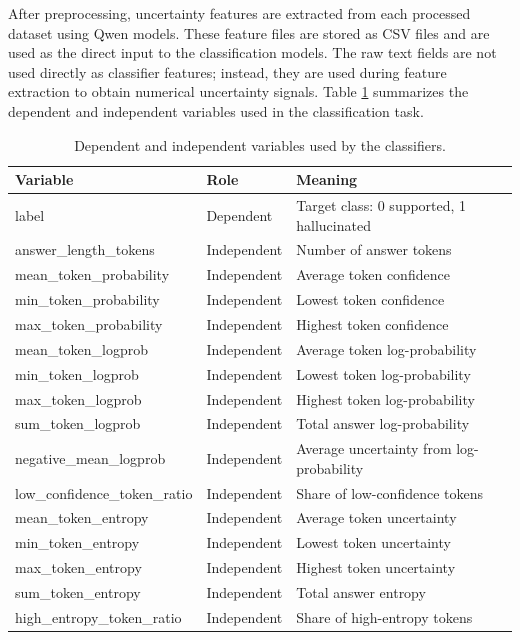 \documentclass[11pt]{article}
\begin{document}
After preprocessing, uncertainty features are extracted from each processed dataset using Qwen models. These feature files are stored as CSV files and are used as the direct input to the classification models. The raw text fields are not used directly as classifier features; instead, they are used during feature extraction to obtain numerical uncertainty signals. Table \ref{tab:variables} summarizes the dependent and independent variables used in the classification task.

\begin{table}[H]
    \centering
    \small
    \begin{tabular}{lll}
        \toprule
        Variable & Role & Meaning \\
        \midrule
        label & Dependent & Target class: 0 supported, 1 hallucinated \\
        answer\_length\_tokens & Independent & Number of answer tokens \\
        mean\_token\_probability & Independent & Average token confidence \\
        min\_token\_probability & Independent & Lowest token confidence \\
        max\_token\_probability & Independent & Highest token confidence \\
        mean\_token\_logprob & Independent & Average token log-probability \\
        min\_token\_logprob & Independent & Lowest token log-probability \\
        max\_token\_logprob & Independent & Highest token log-probability \\
        sum\_token\_logprob & Independent & Total answer log-probability \\
        negative\_mean\_logprob & Independent & Average uncertainty from log-probability \\
        low\_confidence\_token\_ratio & Independent & Share of low-confidence tokens \\
        mean\_token\_entropy & Independent & Average token uncertainty \\
        min\_token\_entropy & Independent & Lowest token uncertainty \\
        max\_token\_entropy & Independent & Highest token uncertainty \\
        sum\_token\_entropy & Independent & Total answer entropy \\
        high\_entropy\_token\_ratio & Independent & Share of high-entropy tokens \\
        \bottomrule
    \end{tabular}
    \caption{Dependent and independent variables used by the classifiers.}
    \label{tab:variables}
\end{table}
\end{document}
